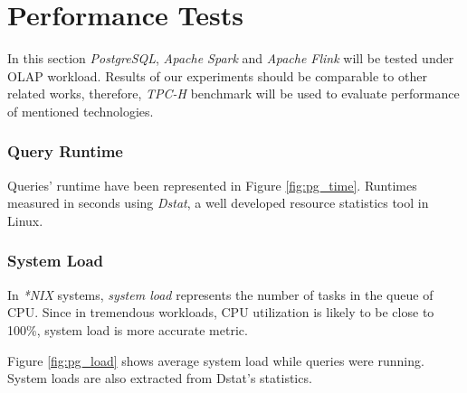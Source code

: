 \documentclass[report.tex]{subfiles}
\begin{document}
\section{Performance Tests}

In this section \textit{PostgreSQL}\cite{postgres}, \textit{Apache Spark}\cite{spark} and \textit{Apache Flink}\cite{flink} will be tested under OLAP workload. Results of our experiments should be comparable to other related works, therefore, \textit{TPC-H}\cite{tpch} benchmark will be used to evaluate performance of mentioned technologies.

\subsubsection{Query Runtime}
Queries' runtime have been represented in Figure \ref{fig:pg_time}. Runtimes measured in seconds using \textit{Dstat}\cite{dstat}, a well developed resource statistics tool in Linux.


\subsubsection{System Load}
In \textit{*NIX} systems, \textit{system load} represents the number of tasks in the queue of CPU. Since in tremendous workloads, CPU utilization is likely to be close to 100\%, system load is more accurate metric.

Figure \ref{fig:pg_load} shows average system load while queries were running. System loads are also extracted from Dstat's statistics.

\end{document}
